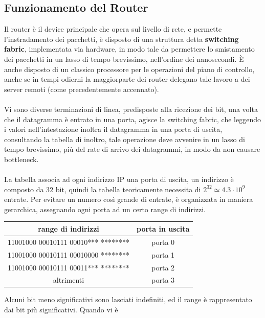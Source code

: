 \documentclass[12pt, letterpaper]{article}
\newcommand{\acc}{\\\hphantom{}\\}
\begin{document}
\subsection{Funzionamento del Router}
Il router è il device principale che opera sul livello di rete, e permette l'instradamento dei pacchetti, è disposto di una 
struttura detta \textbf{switching fabric}, implementata via hardware, in modo tale da permettere lo smistamento dei pacchetti in 
un lasso di tempo brevissimo, nell'ordine dei nanosecondi. È anche disposto di un classico processore per le operazioni 
del piano di controllo, anche se in tempi odierni la maggiorparte dei router delegano tale lavoro a dei server 
remoti (come precedentemente accennato). \acc 
Vi sono diverse terminazioni di linea, predisposte alla ricezione dei bit, una volta che il datagramma 
è entrato in una porta, agisce 
la switching fabric, che leggendo i valori nell'intestazione inoltra il datagramma in una porta di uscita, consultando 
la tabella di inoltro, tale operazione deve avvenire in un lasso di tempo brevissimo, più del rate di arrivo dei datagrammi, in modo 
da non causare bottleneck.\acc 
La tabella associa ad ogni indirizzo IP una porta di uscita, un indirizzo è composto da 32 bit, quindi la tabella teoricamente 
necessita di $2^{32} \simeq 4.3\cdot 10^9 $ entrate. Per evitare un numero così grande di entrate, è organizzata 
in maniera gerarchica, assegnando ogni porta ad un certo range di indirizzi.\begin{center}
    \begin{tabular}{|c|c|}
        \hline
        \rowcolor[HTML]{C0C0C0} 
        \textbf{range di indirizzi}            & \textbf{porta in uscita}        \\ \hline
        \rowcolor[HTML]{FFFFFF} 
        11001000  00010111  00010***  ******** & \cellcolor[HTML]{FFFFFF}porta 0 \\ \hline
        \rowcolor[HTML]{FFFFFF} 
        11001000  00010111  00010000  ******** & porta 1                         \\ \hline
        \rowcolor[HTML]{FFFFFF} 
        11001000  00010111  00011***  ******** & \cellcolor[HTML]{FFFFFF}porta 2 \\ \hline
        altrimenti                             & porta 3                         \\ \hline
        \end{tabular}
\end{center}
Alcuni bit meno significativi sono lasciati indefiniti, ed il range è rappresentato dai bit più significativi. Quando vi è 
\end{document}
